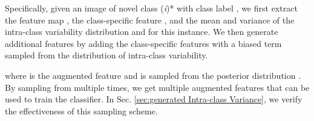 \documentclass[10pt,twocolumn,letterpaper]{article}
\begin{document}
Specifically, given an image of novel class (\textit{i})* with class label , we first extract the feature map , the class-specific feature , and the mean and variance of the intra-class variability distribution  and  for this instance.
     We then generate additional features by adding the class-specific features  with a biased term sampled from the distribution of intra-class variability. 
     
     \noindent where  is the augmented feature and  is sampled from the posterior distribution .
    By sampling from  multiple times, we get multiple augmented features  that can be used to train the classifier. In Sec. \ref{sec:generated Intra-class Variance}, we verify the effectiveness of this sampling scheme.


    
    


    
    
\begin{comment}
    
     


      
\end{comment} 
\end{document}

